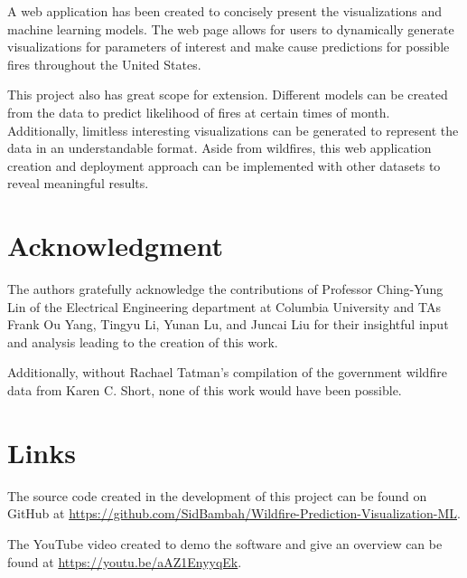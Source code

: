 \documentclass[conference]{IEEEtran}
\begin{document}
A web application has been created to concisely present the visualizations and machine learning models. The web page allows for users to dynamically generate visualizations for parameters of interest and make cause predictions for possible fires throughout the United States. \par

This project also has great scope for extension. Different models can be created from the data to predict likelihood of fires at certain times of month. Additionally, limitless interesting visualizations can be generated to represent the data in an understandable format. Aside from wildfires, this web application creation and deployment approach can be implemented with other datasets to reveal meaningful results. \par

\section*{Acknowledgment}
The authors gratefully acknowledge the contributions of Professor Ching-Yung Lin of the Electrical Engineering department at Columbia University and TAs Frank Ou Yang, Tingyu Li, Yunan Lu, and Juncai Liu for their insightful input and analysis leading to the creation of this work. \par
Additionally, without Rachael Tatman's compilation of the government wildfire data from Karen C. Short, none of this work would have been possible. \par

\nocite{*}

 \appendices

\section{Links}
\label{appendix:Links}
The source code created in the development of this project can be found on GitHub at \url{https://github.com/SidBambah/Wildfire-Prediction-Visualization-ML}. \par

The YouTube video created to demo the software and give an overview can be found at \url{https://youtu.be/aAZ1EnyyqEk}.\par
  
\vspace{12pt}
\end{document}
